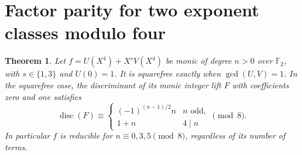 \documentclass[11pt]{article}
\newtheorem{theorem}{Theorem}
\begin{document}
\section{Factor parity for two exponent classes modulo four}
\label{sec:two-residue-parity}
\begin{theorem}\label{thm:two-residue-parity}
Let \(f=U(X^4)+X^s V(X^4)\) be monic of degree \(n>0\) over
\(\mathbb F_2\), with \(s\in\{1,3\}\) and \(U(0)=1\).
It is squarefree exactly when \(\gcd(U,V)=1\). In the squarefree
case, the discriminant of its monic integer lift \(F\) with
coefficients zero and one satisfies
\[
  \operatorname{disc}(F)\equiv
  \begin{cases}
     (-1)^{(n-1)/2}n & n\text{ odd},\\
     1+n & 4\mid n
  \end{cases}\pmod 8 .
\]
In particular \(f\) is reducible for \(n\equiv 0,3,5\pmod 8\),
regardless of its number of terms.
\end{theorem}
\end{document}
